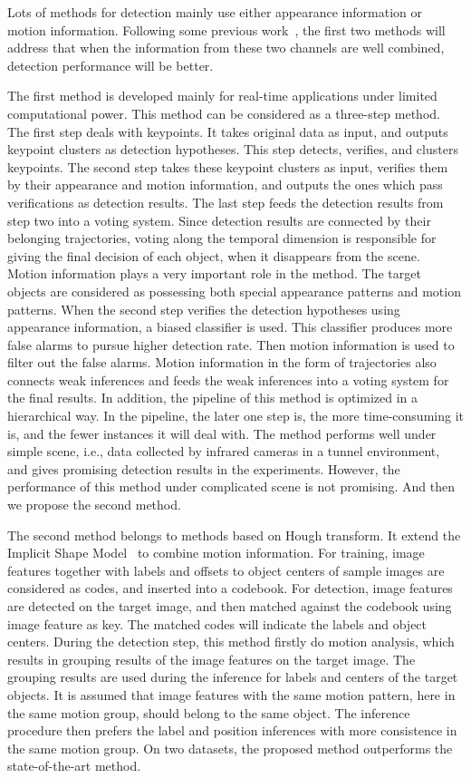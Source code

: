   Lots of methods for detection mainly use either appearance information or motion information. Following some previous work~\citep{pvm},  the first two methods will address that when the information from these two channels are well combined, detection performance will be better.


 The first method is developed mainly for real-time applications under limited computational power.  This method can be considered as a three-step method. The first step deals with keypoints. It
takes original data as input, and outputs keypoint clusters as detection hypotheses. This step detects, verifies, and clusters keypoints. The second
step takes these keypoint clusters as input, verifies them by their appearance and motion
information, and outputs the ones which pass verifications as detection results. The last step feeds the detection results from step two into a voting system. Since detection results are connected by their belonging trajectories, voting along the temporal dimension is responsible for giving the final decision of  each object,  when it disappears from the scene.   Motion information plays a very important role in the method. The target objects are considered as possessing both special appearance patterns and motion patterns. When the second step verifies the detection hypotheses using appearance information, a biased classifier is used. This classifier produces more false alarms to pursue higher detection rate. Then motion information is used to filter out the false alarms. Motion information in the form of trajectories also connects weak inferences and feeds the weak inferences into a voting system for the final results. In addition, the pipeline of this method is optimized in a hierarchical way. In the pipeline, the later one step is, the more time-consuming it is, and the fewer instances it will deal with. The method performs well under simple scene, i.e., data collected by infrared cameras in a tunnel environment, and gives promising detection results in the experiments. However, the performance of this method under complicated scene is not promising. And then we propose the second method.

The second method belongs to methods based on Hough transform. It extend the Implicit Shape Model~\citep{lb1} to combine motion information. For training, image features together with labels and offsets to object centers of sample images are considered as codes, and inserted into a codebook. For detection, image features are detected on the target image, and then matched against the codebook using image feature as key. The matched codes will indicate the labels and object centers. During the detection step, this method firstly do motion analysis, which results in grouping results of the image features on the target image. The grouping results are used during the inference for labels and centers of the target objects. It is assumed that image features with the same motion pattern, here in the same motion group, should belong to the same object. The inference procedure then prefers the label and position inferences with more consistence in the same motion group. On two datasets, the proposed method outperforms the state-of-the-art method.

